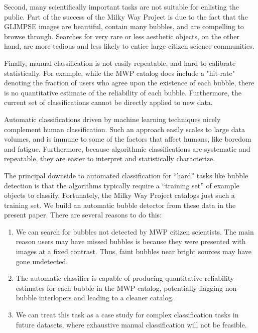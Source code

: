 \documentclass[preprint]{aastex}
\begin{document}
Second, many scientifically important tasks are not suitable for enlisting the public. Part of the success of the Milky Way Project is due to the fact that the GLIMPSE images are beautiful, contain many bubbles, and are compelling to browse through. Searches for very rare or less aesthetic objects, on the other hand, are more tedious and less likely to entice large citizen science communities. 

Finally, manual classification is not easily repeatable, and hard to calibrate statistically. For example, while the MWP catalog does include a "hit-rate" denoting the fraction of users who agree upon the existence of each bubble, there is no quantitative estimate of the reliability of each bubble. Furthermore, the current set of classifications cannot be directly applied to new data.

Automatic classifications driven by machine learning techniques nicely complement human classification. Such an approach easily scales to large data volumes, and is immune to some of the factors that affect humans, like boredom and fatigue. Furthermore, because algorithmic classifications are systematic and repeatable, they are easier to interpret and statistically characterize. 

The principal downside to automated classification for ``hard'' tasks like bubble detection is that the algorithms typically require a ``training set'' of example objects to classify. Fortunately, the Milky Way Project catalogs just such a training set. We build an automatic bubble detector from these data in the present paper. There are several reasons to do this:

\begin{enumerate}
\item We can search for bubbles not detected by MWP citizen scientists. The main reason users may have missed bubbles is because they were presented with images at a fixed contrast. Thus, faint bubbles near bright sources may have gone undetected.

\item The automatic classifier is capable of producing quantitative reliability estimates for each bubble in the MWP catalog, potentially flagging non-bubble interlopers and leading to a cleaner catalog.

\item We can treat this task as a case study for complex classification tasks in future datasets, where exhaustive manual classification will not be feasible.

\end{enumerate}
\end{document}
